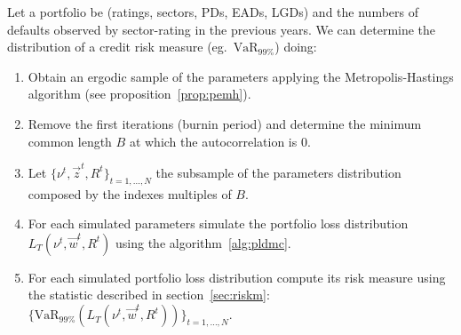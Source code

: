 \documentclass[11pt,fleqn]{book} %
\begin{document}
\begin{algorithm}
	\label{alg:crmd}
	Let a portfolio be (ratings, sectors, PDs, EADs, LGDs) and the numbers 
	of defaults observed by sector-rating in the previous years. We can
	determine the distribution of a credit risk measure 
	(eg.\ $\text{VaR}_{99\%}$) doing:
	\begin{enumerate}
		\item Obtain an ergodic sample of the parameters applying the
		Metropolis-Hastings algorithm (see proposition~\ref{prop:pemh}).
		\item Remove the first iterations (burnin period) and determine
		the minimum common length $B$ at which the autocorrelation is $0$.
		\item Let $\{\nu^t, \vec{z}^t, R^t\}_{t=1,\dots,N}$ the subsample
		of the parameters distribution composed by the indexes multiples 
		of $B$.
		\item For each simulated parameters simulate the portfolio loss 
		distribution $L_T(\nu^t,\vec{w}^t,R^t)$ using the algorithm~\ref{alg:pldmc}.
		\item For each simulated portfolio loss distribution compute its 
		risk measure using the statistic described in section~\ref{sec:riskm}:
		$\{\text{VaR}_{99\%}(L_T(\nu^t,\vec{w}^t,R^t))\}_{t=1,\dots,N}$.
	\end{enumerate}
\end{algorithm}
\end{document}
